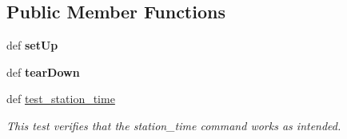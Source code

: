 \subsection*{Public Member Functions}
\begin{DoxyCompactItemize}
\item 
\hypertarget{classhwm_1_1command_1_1handlers_1_1tests_1_1test__system__command__handler_1_1_test_system_command_handler_ae9a81cb11e59294e8c62ef4fa90190f7}{def {\bfseries set\-Up}}\label{classhwm_1_1command_1_1handlers_1_1tests_1_1test__system__command__handler_1_1_test_system_command_handler_ae9a81cb11e59294e8c62ef4fa90190f7}

\item 
\hypertarget{classhwm_1_1command_1_1handlers_1_1tests_1_1test__system__command__handler_1_1_test_system_command_handler_ae0ea090d56b5637e1e390debcf597d5e}{def {\bfseries tear\-Down}}\label{classhwm_1_1command_1_1handlers_1_1tests_1_1test__system__command__handler_1_1_test_system_command_handler_ae0ea090d56b5637e1e390debcf597d5e}

\item 
\hypertarget{classhwm_1_1command_1_1handlers_1_1tests_1_1test__system__command__handler_1_1_test_system_command_handler_a32549e8e71d152ad8111410b27b0aba4}{def \hyperlink{classhwm_1_1command_1_1handlers_1_1tests_1_1test__system__command__handler_1_1_test_system_command_handler_a32549e8e71d152ad8111410b27b0aba4}{test\-\_\-station\-\_\-time}}\label{classhwm_1_1command_1_1handlers_1_1tests_1_1test__system__command__handler_1_1_test_system_command_handler_a32549e8e71d152ad8111410b27b0aba4}

\begin{DoxyCompactList}\small\item\em This test verifies that the station\-\_\-time command works as intended. \end{DoxyCompactList}\end{DoxyCompactItemize}
